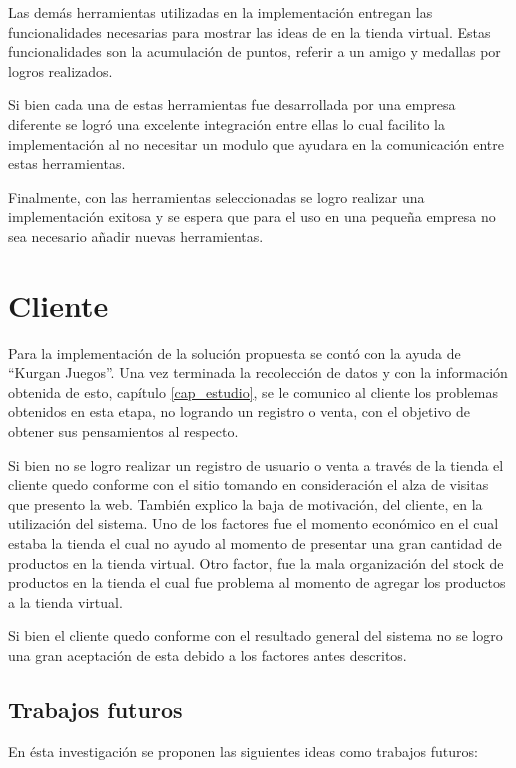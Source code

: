 Las demás herramientas utilizadas en la implementación entregan las funcionalidades necesarias para mostrar
las ideas de {\gam} en la tienda virtual. Estas funcionalidades son la acumulación de puntos, referir a un amigo
y medallas por logros realizados.

Si bien cada una de estas herramientas fue desarrollada por una empresa diferente se logró una excelente
integración entre ellas lo cual facilito la implementación al no necesitar un modulo que ayudara en la comunicación
entre estas herramientas.

Finalmente, con las herramientas seleccionadas se logro realizar una implementación exitosa y se espera que para
el uso en una pequeña empresa no sea necesario añadir nuevas herramientas.

\section{Cliente}

Para la implementación de la solución propuesta se contó con la ayuda de ``Kurgan Juegos''. Una vez terminada
la recolección de datos y con la información obtenida de esto, capítulo \ref{cap_estudio}, se le comunico
al cliente los problemas obtenidos en esta etapa, no logrando un registro o venta, con el objetivo de obtener
sus pensamientos al respecto.

Si bien no se logro realizar un registro de usuario o venta a través de la tienda el cliente quedo conforme con
el sitio tomando en consideración el alza de visitas que presento la web. También explico la baja de motivación,
del cliente, en la utilización del sistema. Uno de los factores fue el momento económico en el cual estaba la tienda
el cual no ayudo al momento de presentar una gran cantidad de productos en la tienda virtual. Otro factor, fue la
mala organización del stock de productos en la tienda el cual fue problema al momento de agregar los productos
a la tienda virtual.

Si bien el cliente quedo conforme con el resultado general del sistema no se logro una gran aceptación de esta
debido a los factores antes descritos.

\subsection{Trabajos futuros}

En ésta investigación se proponen las siguientes ideas como trabajos futuros:


